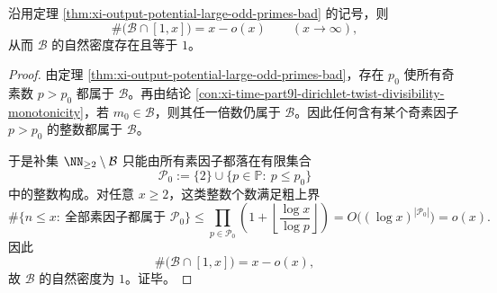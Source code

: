 \begin{corollary}\label{cor:xi-output-potential-bad-moduli-density-one}
沿用定理 \ref{thm:xi-output-potential-large-odd-primes-bad} 的记号，则
\[
\#\bigl(\mathcal B\cap [1,x]\bigr)=x-o(x)
\qquad(x\to\infty),
\]
从而 \(\mathcal B\) 的自然密度存在且等于 \(1\)。
\end{corollary}
\begin{proof}
由定理 \ref{thm:xi-output-potential-large-odd-primes-bad}，存在 \(p_0\) 使所有奇素数 \(p>p_0\) 都属于 \(\mathcal B\)。再由结论
\ref{con:xi-time-part9l-dirichlet-twist-divisibility-monotonicity}，若 \(m_0\in\mathcal B\)，则其任一倍数仍属于 \(\mathcal B\)。因此任何含有某个奇素因子 \(p>p_0\) 的整数都属于 \(\mathcal B\)。

于是补集 \(\NN_{\ge 2}\setminus\mathcal B\) 只能由所有素因子都落在有限集合
\[
\mathcal P_0:=\{2\}\cup\{p\in\mathbb P:\ p\le p_0\}
\]
中的整数构成。对任意 \(x\ge 2\)，这类整数个数满足粗上界
\[
\#\{n\le x:\ \text{全部素因子都属于 }\mathcal P_0\}
\le
\prod_{p\in\mathcal P_0}
\left(1+\left\lfloor\frac{\log x}{\log p}\right\rfloor\right)
=
O\!\bigl((\log x)^{|\mathcal P_0|}\bigr)
=
o(x).
\]
因此
\[
\#\bigl(\mathcal B\cap [1,x]\bigr)=x-o(x),
\]
故 \(\mathcal B\) 的自然密度为 \(1\)。证毕。
\end{proof}

